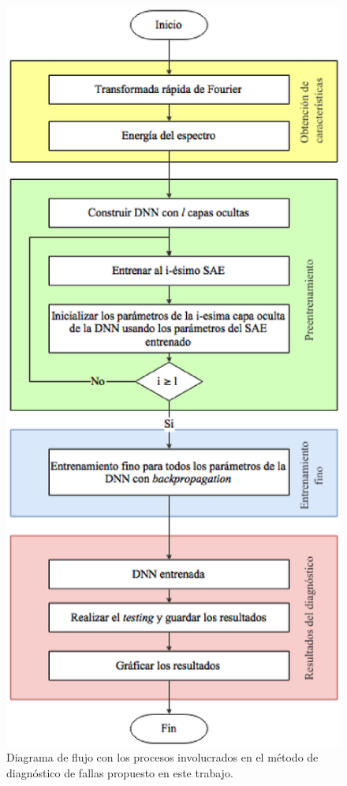 \documentclass[12pt]{article}
\begin{document}
\begin{figure}[ht]
  \centering
    \includegraphics[scale=0.7]{./block.eps}
  \caption{Diagrama de flujo con los procesos involucrados en el método de diagnóstico de fallas propuesto en este trabajo.}
  \label{fig:block}
\end{figure}
\end{document}
